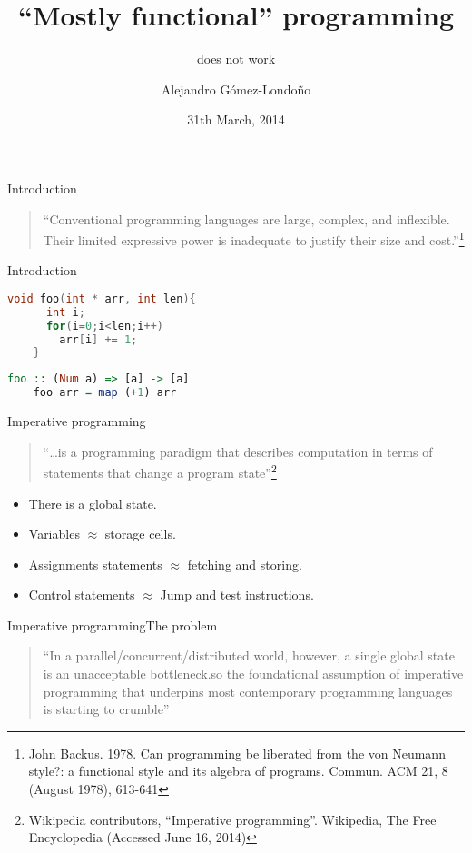 \documentclass[rail]{beamer}
\title{``Mostly functional'' programming}
\subtitle{does not work}
\author{Alejandro Gómez-Londoño}
\date{31th March, 2014}
\institute{EAFIT University}
\begin{document}
\begin{frame}
  \titlepage
\end{frame}

\begin{frame}{Introduction}
  \begin{quote}
    ``Conventional programming languages are large, complex, and
    inflexible. Their limited expressive power is inadequate to
    justify their size and cost.''\footnote[frame,1] {John
      Backus. 1978. Can programming be liberated from the von Neumann
      style?: a functional style and its algebra of
      programs. Commun. ACM 21, 8 (August 1978), 613-641}
  \end{quote}
\end{frame}

\begin{frame}[fragile]{Introduction}

  \begin{lstlisting}[language=C]
    void foo(int * arr, int len){
      int i;
      for(i=0;i<len;i++)
        arr[i] += 1;
    }
  \end{lstlisting}
  \pause
  \begin{lstlisting}[language=Haskell]
    foo :: (Num a) => [a] -> [a]
    foo arr = map (+1) arr
  \end{lstlisting}
\end{frame}

\begin{frame}{Imperative programming}
  \begin{quote}
    ``\dots is a programming paradigm that describes computation in terms
    of statements that change a program state''\footnote[frame,1]
    {Wikipedia contributors, ``Imperative programming''.
      Wikipedia, The Free Encyclopedia (Accessed June 16, 2014)}
  \end{quote}
  \pause
  \begin{itemize}[<+->]
  \item There is a global state.
  \item Variables $\approx$ storage cells.
  \item Assignments statements $\approx$ fetching and storing.
  \item Control statements $\approx$ Jump and test instructions.
  \end{itemize}
\end{frame}

\begin{frame}{Imperative programming}{The problem}
  \begin{quote}
    ``In a parallel/concurrent/distributed world, however, a single
    global state is an unacceptable bottleneck.so the foundational
    assumption of imperative programming that underpins most
    contemporary programming languages is starting to crumble''
  \end{quote}

\end{frame}
\end{document}
